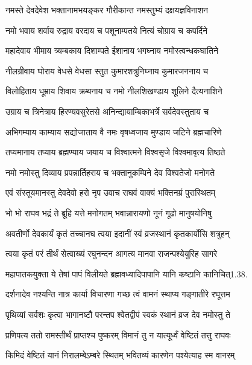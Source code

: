 \twolineshloka
{नमस्ते देवदेवेश भक्तानामभयङ्कर}
{गौरीकान्त नमस्तुभ्यं दक्षयज्ञविनाशन}%

\twolineshloka
{नमो भवाय शर्वाय रुद्राय वरदाय च}
{पशूनाम्पतये नित्यं चोग्राय च कपर्दिने}%

\twolineshloka
{महादेवाय भीमाय त्र्यम्बकाय दिशाम्पते}
{ईशानाय भगघ्नाय नमोस्त्वन्धकघातिने}%

\twolineshloka
{नीलग्रीवाय घोराय वेधसे वेधसा स्तुत}
{कुमारशत्रुनिघ्नाय कुमारजननाय च}%

\twolineshloka
{विलोहिताय धूम्राय शिवाय क्रथनाय च}
{नमो नीलशिखण्डाय शूलिने दैत्यनाशिने}%

\twolineshloka
{उग्राय च त्रिनेत्राय हिरण्यवसुरेतसे}
{अनिन्द्यायाम्बिकाभर्त्रे सर्वदेवस्तुताय च}%

\twolineshloka
{अभिगम्याय काम्याय सद्योजाताय वै नमः}
{वृषध्वजाय मुण्डाय जटिने ब्रह्मचारिणे}%

\twolineshloka
{तप्यमानाय तप्याय ब्रह्मण्याय जयाय च}
{विश्वात्मने विश्वसृजे विश्वमावृत्य तिष्ठते}%

\twolineshloka
{नमो नमोस्तु दिव्याय प्रपन्नार्तिहराय च}
{भक्तानुकम्पिने देव विश्वतेजो मनोगते}%


\twolineshloka
{एवं संस्तूयमानस्तु देवदेवो हरो नृप}
{उवाच राघवं वाक्यं भक्तिनम्रं पुरास्थितम्}%


\twolineshloka
{भो भो राघव भद्रं ते ब्रूहि यत्ते मनोगतम्}
{भवान्नारायणो नूनं गूढो मानुषयोनिषु}%

\twolineshloka
{अवतीर्णो देवकार्यं कृतं तच्चानघ त्वया}
{इदानीं स्वं व्रजस्थानं कृतकार्योसि शत्रुहन्}%

\twolineshloka
{त्वया कृतं परं तीर्थं सेत्वाख्यं रघुनन्दन}
{आगत्य मानवा राजन्पश्येयुरिह सागरे}%

\twolineshloka
{महापातकयुक्ता ये तेषां पापं विलीयते}
{ब्रह्मवध्यादिपापानि यानि कष्टानि कानिचित्1.38.}%

\twolineshloka
{दर्शनादेव नश्यन्ति नात्र कार्या विचारणा}
{गच्छ त्वं वामनं स्थाप्य गङ्गातीरे रघूत्तम}%

\twolineshloka
{पृथिव्यां सर्वशः कृत्वा भागानष्टौ परन्तप}
{श्वेतद्वीपं स्वकं स्थानं व्रज देव नमोस्तु ते}%

\twolineshloka
{प्रणिपत्य ततो रामस्तीर्थं प्राप्तश्च पुष्करम्}
{विमानं तु न यात्यूर्ध्वं वेष्टितं तत्तु राघवः}%

\twolineshloka
{किमिदं वेष्टितं यानं निरालम्बेऽम्बरे स्थितम्}
{भवितव्यं कारणेन पश्येत्याह स्म वानरम्}%

